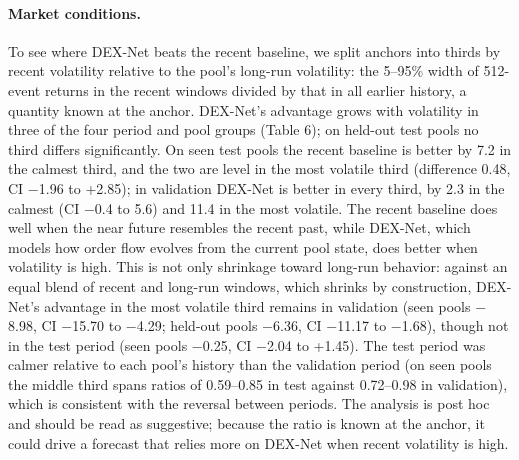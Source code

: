 \documentclass[11pt]{article}
\begin{document}
\paragraph{Market conditions.} To see where DEX-Net beats the recent baseline, we split anchors into thirds by recent volatility relative to the pool's long-run volatility: the 5--95\% width of 512-event returns in the recent windows divided by that in all earlier history, a quantity known at the anchor. DEX-Net's advantage grows with volatility in three of the four period and pool groups (Table 6); on held-out test pools no third differs significantly. On seen test pools the recent baseline is better by 7.2 in the calmest third, and the two are level in the most volatile third (difference 0.48, CI \ensuremath{-}1.96 to +2.85); in validation DEX-Net is better in every third, by 2.3 in the calmest (CI \ensuremath{-}0.4 to 5.6) and 11.4 in the most volatile. The recent baseline does well when the near future resembles the recent past, while DEX-Net, which models how order flow evolves from the current pool state, does better when volatility is high. This is not only shrinkage toward long-run behavior: against an equal blend of recent and long-run windows, which shrinks by construction, DEX-Net's advantage in the most volatile third remains in validation (seen pools \ensuremath{-}8.98, CI \ensuremath{-}15.70 to \ensuremath{-}4.29; held-out pools \ensuremath{-}6.36, CI \ensuremath{-}11.17 to \ensuremath{-}1.68), though not in the test period (seen pools \ensuremath{-}0.25, CI \ensuremath{-}2.04 to +1.45). The test period was calmer relative to each pool's history than the validation period (on seen pools the middle third spans ratios of 0.59--0.85 in test against 0.72--0.98 in validation), which is consistent with the reversal between periods. The analysis is post hoc and should be read as suggestive; because the ratio is known at the anchor, it could drive a forecast that relies more on DEX-Net when recent volatility is high.
\end{document}
